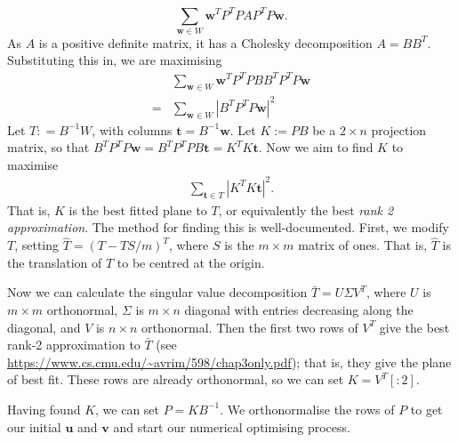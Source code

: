 \documentclass{article}
\renewcommand{\v}[1]{\boldsymbol{#1}}
\begin{document}
\[
\sum_{\v{w}\in W} \v{w}^T P^T P A P^T P\v{w}.
\]
As $A$ is a positive definite matrix, it has a Cholesky decomposition $A = BB^T$. Substituting this in, we are maximising
\begin{align*}
&\sum_{\v{w}\in W} \v{w}^T P^T P B B^T P^T P\v{w}\\
=& \sum_{\v{w}\in W} |B^T P^T P\v{w}|^2
\end{align*}
Let $T: = B^{-1}W$, with columns $\v{t} = B^{-1}\v{w}$. 
Let $K := PB$ be a $2 \times n$ projection matrix, so that $B^T P^T P \v{w} = B^T P^T P B \v{t} = K^T K \v{t}$. Now we aim to find $K$ to maximise 
\begin{align*}
\sum_{\v{t}\in T} |K^T K\v{t}|^2.
\end{align*}
That is, $K$ is the best fitted plane to $T$, or equivalently the best \emph{rank 2 approximation}. The method for finding this is well-documented.
First, we modify $T$, setting $\hat{T}= (T - TS/m)^T$, where $S$ is the $m \times m$ matrix of ones. That is, $\hat{T}$ is the translation of $T$ to be centred at the origin.

Now we can calculate the singular value decomposition $\bar{T} = U \Sigma V^T$, where $U$ is $m \times m$ orthonormal, $\Sigma$ is $m\times n$ diagonal with entries decreasing along the diagonal, and $V$ is $n \times n$ orthonormal. Then the first two rows of $V^T$ give the best rank-2 approximation to $\bar{T}$ (see \url{https://www.cs.cmu.edu/~avrim/598/chap3only.pdf}); that is, they give the plane of best fit. These rows are already orthonormal, so we can set $K = V^T[:2]$. 

Having found $K$, we can set $P = K B^{-1}$. We orthonormalise the rows of $P$ to get our initial $\v{u}$ and $\v{v}$ and start our numerical optimising process.
\end{document}
